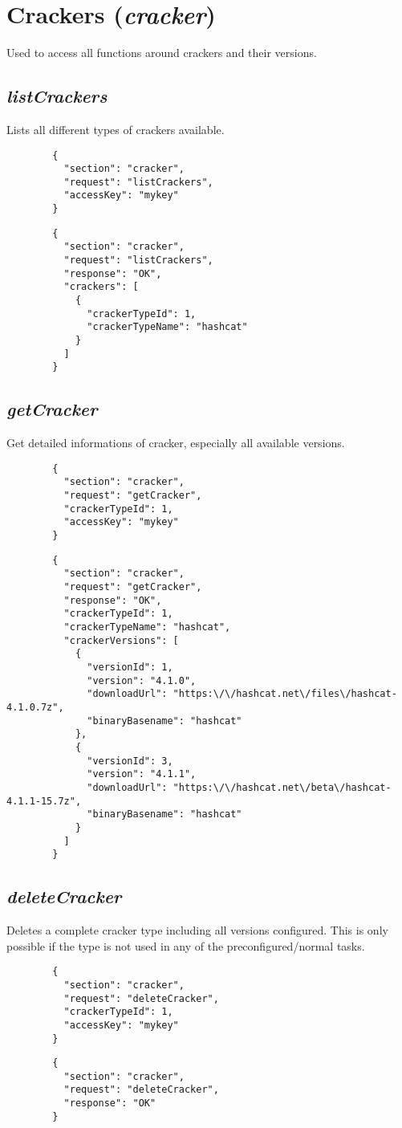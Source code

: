 \section*{Crackers (\textit{cracker})}
	Used to access all functions around crackers and their versions.
	
\subsection*{\textit{listCrackers}}
	Lists all different types of crackers available.
	{
		\color{blue}
		\begin{verbatim}
		{
		  "section": "cracker",
		  "request": "listCrackers",
		  "accessKey": "mykey"
		}
		\end{verbatim}
	}
	{
		\color{OliveGreen}
		\begin{verbatim}
		{
		  "section": "cracker",
		  "request": "listCrackers",
		  "response": "OK",
		  "crackers": [
		    {
		      "crackerTypeId": 1,
		      "crackerTypeName": "hashcat"
		    }
		  ]
		}
		\end{verbatim}
	}
\subsection*{\textit{getCracker}}
	Get detailed informations of cracker, especially all available versions.
	{
		\color{blue}
		\begin{verbatim}
		{
		  "section": "cracker",
		  "request": "getCracker",
		  "crackerTypeId": 1,
		  "accessKey": "mykey"
		}
		\end{verbatim}
	}
	{
		\color{OliveGreen}
		\begin{verbatim}
		{
		  "section": "cracker",
		  "request": "getCracker",
		  "response": "OK",
		  "crackerTypeId": 1,
		  "crackerTypeName": "hashcat",
		  "crackerVersions": [
		    {
		      "versionId": 1,
		      "version": "4.1.0",
		      "downloadUrl": "https:\/\/hashcat.net\/files\/hashcat-4.1.0.7z",
		      "binaryBasename": "hashcat"
		    },
		    {
		      "versionId": 3,
		      "version": "4.1.1",
		      "downloadUrl": "https:\/\/hashcat.net\/beta\/hashcat-4.1.1-15.7z",
		      "binaryBasename": "hashcat"
		    }
		  ]
		}
		\end{verbatim}
	}
\subsection*{\textit{deleteCracker}}
	Deletes a complete cracker type including all versions configured. This is only possible if the type is not used in any of the preconfigured/normal tasks.
	{
		\color{blue}
		\begin{verbatim}
		{
		  "section": "cracker",
		  "request": "deleteCracker",
		  "crackerTypeId": 1,
		  "accessKey": "mykey"
		}
		\end{verbatim}
	}
	{
		\color{OliveGreen}
		\begin{verbatim}
		{
		  "section": "cracker",
		  "request": "deleteCracker",
		  "response": "OK"
		}
		\end{verbatim}
	}
